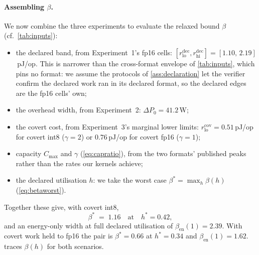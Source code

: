 \documentclass{article}
\theoremstyle{plain}
\theoremstyle{definition}
\theoremstyle{remark}
\begin{document}
\paragraph{Assembling $\beta$.}
We now combine the three experiments to evaluate the relaxed bound $\beta$
(cf.\ \cref{tab:inputs}):
\begin{itemize}
	\item the declared band, from Experiment~1's fp16 cells:
	$[r_{\mathrm{lo}}^{\mathrm{dec}}, r_{\mathrm{hi}}^{\mathrm{dec}}]
	= [1.10,\,2.19]$\,pJ/op. This is narrower than the cross-format
	envelope of \cref{tab:inputs}, which pins no format: we assume
	the protocols of \cref{ass:declaration} let the verifier confirm the declared work
	ran in its declared format, so the declared edges are the fp16 cells'
	own;
	\item the overhead width, from Experiment~2:
	$\Delta P_0 = 41.2$\,W;
	\item the covert cost, from Experiment~3's marginal lower limits:
	$r_{\mathrm{lo}}^{\mathrm{cov}} = 0.51$\,pJ/op for covert int8
	($\gamma = 2$) or $0.76$\,pJ/op for covert fp16 ($\gamma = 1$);
	\item capacity $C_{\max}$ and $\gamma$ (\cref{eq:capratio}), from the
	two formats' published peaks rather than the rates our kernels
	achieve;
	\item the declared utilisation $h$: we take the worst case
	$\beta^{*} = \max_h \beta(h)$ (\cref{eq:betaworst}).
\end{itemize}
Together these give, with covert int8,
\begin{equation}
	\beta^{*} \;=\; 1.16
	\quad\text{at}\quad h^{*} = 0.42,
	\label{eq:betafloormeasured}
\end{equation}
and an energy-only width at full declared utilisation of
$\beta_{\mathrm{en}}(1) = 2.39$. With covert work held to fp16 the pair
is $\beta^{*} = 0.66$ at $h^{*} = 0.34$ and
$\beta_{\mathrm{en}}(1) = 1.62$.  traces $\beta(h)$
for both scenarios.
\end{document}
